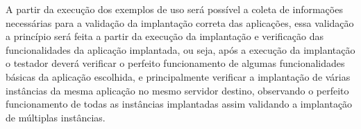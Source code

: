 A partir da execução dos exemplos de uso será possível a coleta de informações
necessárias para a validação da implantação correta das aplicações, essa
validação a princípio será feita a partir da execução da implantação e
verificação das funcionalidades da aplicação implantada, ou seja,
após a execução da implantação o testador deverá verificar o perfeito
funcionamento de algumas funcionalidades básicas da aplicação escolhida,
e principalmente verificar a implantação de várias instâncias da mesma
aplicação no mesmo servidor destino, observando o perfeito funcionamento de todas as
instâncias implantadas assim validando a implantação de múltiplas instâncias.
